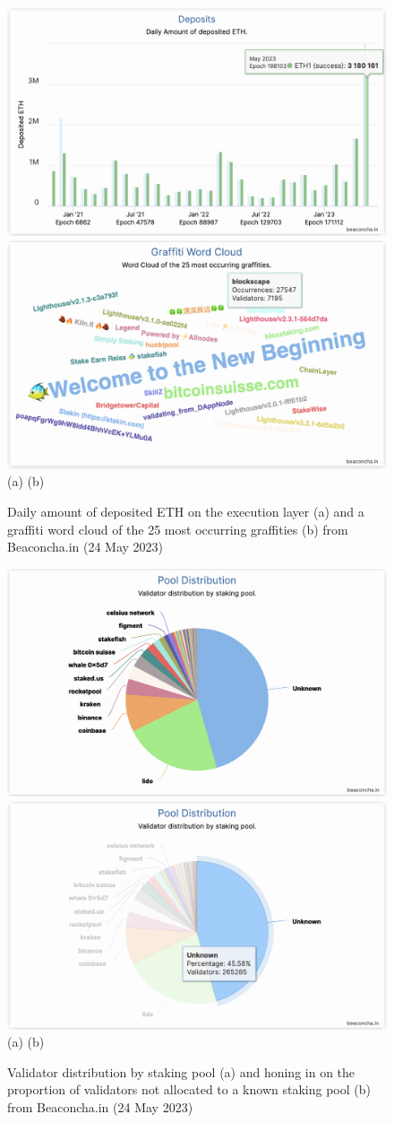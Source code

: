 \documentclass[UTF8]{article}
\begin{document}
{\begin{figure}[htbp]
\begin{center}
\includegraphics[width=0.48\linewidth]{images/bchart11b}
\includegraphics[width=0.48\linewidth]{images/bchart12a} \\
(a)\hspace{160pt}        (b)\\
\caption{Daily amount of deposited ETH on the execution layer  (a) and a graffiti word cloud of the 25 most occurring graffities (b) from Beaconcha.in (24 May 2023)}
\label{fig:chart11}
\end{center}
\end{figure}

\begin{figure}[htbp]
\begin{center}
\includegraphics[width=0.48\linewidth]{images/bchart13a}
\includegraphics[width=0.48\linewidth]{images/bchart13b} \\
(a)\hspace{160pt}        (b)\\
\caption{Validator distribution by staking pool  (a) and honing in on the proportion of validators not allocated to a known staking pool  (b) from Beaconcha.in (24 May 2023)}
\label{fig:chart13a}
\end{center}
\end{figure}

}
\end{document}
